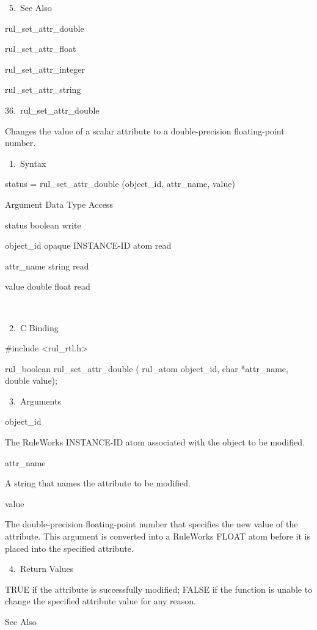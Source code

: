 {       5. See Also

    rul_set_attr_double

    rul_set_attr_float

    rul_set_attr_integer

    rul_set_attr_string

36. rul_set_attr_double

    Changes the value of a scalar attribute to
    a double-precision floating-point number.

       1. Syntax

          status = rul_set_attr_double
          (object_id, attr_name, value)

          Argument  Data Type     Access

          status  boolean     write

          object_id  opaque INSTANCE-ID atom
           read

          attr_name  string     read

          value  double float    read

           

       2. C Binding

          #include <rul_rtl.h>

          rul_boolean rul_set_attr_double (
          rul_atom object_id,
          char *attr_name,
          double value);

       3. Arguments

          object_id

          The RuleWorks INSTANCE-ID atom
          associated with the object to be
          modified.

          attr_name

          A string that names the attribute to
          be modified.

          value

          The double-precision floating-point
          number that specifies the new value
          of the attribute. This argument is
          converted into a RuleWorks FLOAT
          atom before it is placed into the
          specified attribute.

       4. Return Values

          TRUE if the attribute is
          successfully modified; FALSE if the
          function is unable to change the
          specified attribute value for any
          reason.

          See Also

}

